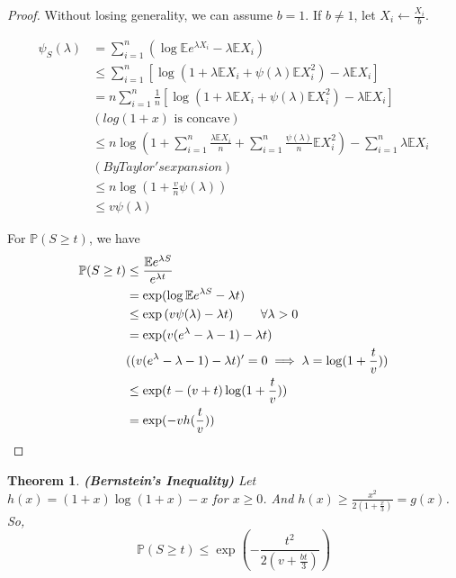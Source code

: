 \documentclass[11pt]{article}
\def\BP{{\bf P}}
\def\BE{{\mathbb E}}
\def\BP{{\mathbb P}}
\newtheorem{theorem}{Theorem}[section]
\begin{document}
\begin{proof}
Without losing generality, we can assume $b = 1$. If $b \neq 1$, let $X_i \leftarrow \frac{X_i}{b}$.

\[\begin{split}
\psi_S(\lambda) &= \sum_{i=1}^n \left(\log \BE e^{\lambda X_i} -\lambda \BE X_i \right) \\
&\leq \sum_{i=1}^n\left[ \log \left( 1 + \lambda \BE X_i + \psi(\lambda) \BE X_i^2 \right) -\lambda \BE X_i \right] \\
&= n \sum_{i=1}^{n} \frac{1}{n} \left[ \log \left( 1 + \lambda \BE X_i + \psi(\lambda) \BE X_i^2 \right) -\lambda \BE X_i \right] \\
& (log(1 + x) \text{ is concave}) \\
&\leq n \log \left( 1 + \sum_{i=1}^{n} \frac{\lambda \BE X_i}{n} + \sum_{i=1}^{n} \frac{\psi(\lambda)}{n}\BE X_i^2 \right) - \sum_{i=1}^{n} \lambda \BE X_i \\
&(By Taylor's expansion)\\
&\leq n \log(1 + \frac{v}{n}\psi(\lambda)) \\
&\leq v\psi(\lambda)
\end{split} \]

For $\BP(S \geq t)$, we have
\[\begin{split} 
\BP(S \geq t) &\leq \frac{\BE e^{\lambda S}}{e^{\lambda t}} \\
&= \exp( \log \BE e^{\lambda S} - \lambda t) \\
&\leq \exp\left( v\psi(\lambda) -\lambda t \right) \text{\quad\quad} \forall \lambda > 0 \\
&= \exp (v(e^\lambda - \lambda - 1) - \lambda t) \\
&((v(e^\lambda -\lambda - 1) -\lambda t)' = 0 \implies \lambda = \log(1 + \frac{t}{v}))\\
&\leq \exp(t - (v+t)\log( 1 + \frac{t}{v})) \\
&= \exp(-vh(\frac{t}{v}))
\end{split} \]
\end{proof}


\begin{theorem}\textbf{(Bernstein's Inequality)}
Let $h(x) = (1+x)\log(1+x) - x$ for $x \geq 0$. And $h(x) \geq \frac{x^2}{2(1 + \frac{x}{3})} = g(x)$.
So,
\[
\BP(S \geq t) \leq \exp\left( - \frac{t^2}{2 (v+\frac{bt}{3})}\right)
\]

\end{theorem}
\end{document}
